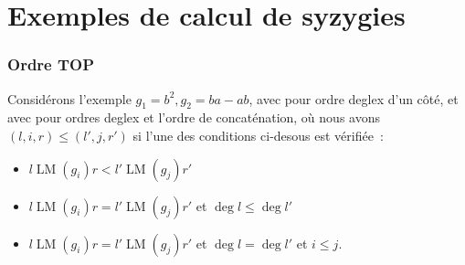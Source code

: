 \documentclass{article}
\DeclareMathOperator{\LM}{LM}
\begin{document}
\section*{Exemples de calcul de syzygies}

\subsubsection*{Ordre TOP}

Considérons l'exemple $g_1 = b^2, g_2 = ba - ab$, avec pour ordre deglex d'un côté, et avec pour ordres deglex et l'ordre de concaténation, où
nous avons $(l, i, r) \leq (l', j, r')$ si l'une des conditions ci-desous est vérifiée~:
\begin{itemize}
	\item $l\LM(g_i)r < l'\LM(g_j)r'$
	\item $l\LM(g_i)r = l'\LM(g_j)r'$ et $\deg{l} \leq \deg{l'}$
	\item $l\LM(g_i)r = l'\LM(g_j)r'$ et $\deg{l} = \deg{l'}$ et $i \leq j$.
\end{itemize}
\end{document}
